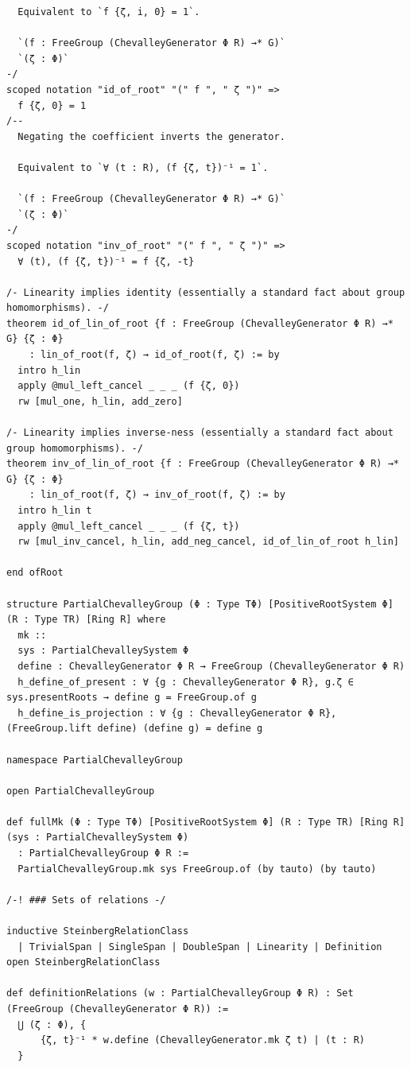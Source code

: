 \begin{Verbatim}
  Equivalent to `f {ζ, i, 0} = 1`.

  `(f : FreeGroup (ChevalleyGenerator Φ R) →* G)`
  `(ζ : Φ)`
-/
scoped notation "id_of_root" "(" f ", " ζ ")" =>
  f {ζ, 0} = 1
/--
  Negating the coefficient inverts the generator.

  Equivalent to `∀ (t : R), (f {ζ, t})⁻¹ = 1`.

  `(f : FreeGroup (ChevalleyGenerator Φ R) →* G)`
  `(ζ : Φ)`
-/
scoped notation "inv_of_root" "(" f ", " ζ ")" =>
  ∀ (t), (f {ζ, t})⁻¹ = f {ζ, -t}

/- Linearity implies identity (essentially a standard fact about group homomorphisms). -/
theorem id_of_lin_of_root {f : FreeGroup (ChevalleyGenerator Φ R) →* G} {ζ : Φ}
    : lin_of_root(f, ζ) → id_of_root(f, ζ) := by
  intro h_lin
  apply @mul_left_cancel _ _ _ (f {ζ, 0})
  rw [mul_one, h_lin, add_zero]

/- Linearity implies inverse-ness (essentially a standard fact about group homomorphisms). -/
theorem inv_of_lin_of_root {f : FreeGroup (ChevalleyGenerator Φ R) →* G} {ζ : Φ}
    : lin_of_root(f, ζ) → inv_of_root(f, ζ) := by
  intro h_lin t
  apply @mul_left_cancel _ _ _ (f {ζ, t})
  rw [mul_inv_cancel, h_lin, add_neg_cancel, id_of_lin_of_root h_lin]

end ofRoot

structure PartialChevalleyGroup (Φ : Type TΦ) [PositiveRootSystem Φ] (R : Type TR) [Ring R] where
  mk ::
  sys : PartialChevalleySystem Φ
  define : ChevalleyGenerator Φ R → FreeGroup (ChevalleyGenerator Φ R)
  h_define_of_present : ∀ {g : ChevalleyGenerator Φ R}, g.ζ ∈ sys.presentRoots → define g = FreeGroup.of g
  h_define_is_projection : ∀ {g : ChevalleyGenerator Φ R}, (FreeGroup.lift define) (define g) = define g

namespace PartialChevalleyGroup

open PartialChevalleyGroup

def fullMk (Φ : Type TΦ) [PositiveRootSystem Φ] (R : Type TR) [Ring R] (sys : PartialChevalleySystem Φ)
  : PartialChevalleyGroup Φ R :=
  PartialChevalleyGroup.mk sys FreeGroup.of (by tauto) (by tauto)

/-! ### Sets of relations -/

inductive SteinbergRelationClass
  | TrivialSpan | SingleSpan | DoubleSpan | Linearity | Definition
open SteinbergRelationClass

def definitionRelations (w : PartialChevalleyGroup Φ R) : Set (FreeGroup (ChevalleyGenerator Φ R)) :=
  ⋃ (ζ : Φ), {
      {ζ, t}⁻¹ * w.define (ChevalleyGenerator.mk ζ t) | (t : R)
  }


\end{Verbatim}
